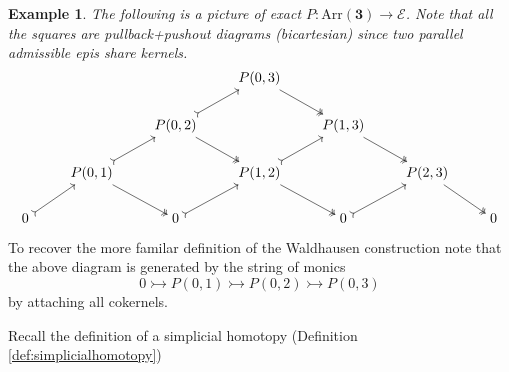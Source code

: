 \documentclass[12pt]{report}
\numberwithin{equation}{section}
\newtheorem{example}[dummy]{Example}
\begin{document}
	\begin{example}
		The following is a picture of exact \( P:\mathrm{Arr}(\mathbf{3}) \to \mathcal{E} \). Note that all the squares are pullback+pushout diagrams (bicartesian) since two parallel admissible epis share kernels.
			\[\begin{tikzcd}[cramped]
				&&& {P(0,3)} \\
				&& {P(0,2)} && {P(1,3)} \\
				& {P(0,1)} && {P(1,2)} && {P(2,3)} \\
				0 && 0 && 0 && 0
				\arrow[two heads, from=1-4, to=2-5]
				\arrow[tail, from=2-3, to=1-4]
				\arrow[two heads, from=2-3, to=3-4]
				\arrow[two heads, from=2-5, to=3-6]
				\arrow[tail, from=3-2, to=2-3]
				\arrow[two heads, from=3-2, to=4-3]
				\arrow[tail, from=3-4, to=2-5]
				\arrow[two heads, from=3-4, to=4-5]
				\arrow[two heads, from=3-6, to=4-7]
				\arrow[tail, from=4-1, to=3-2]
				\arrow[tail, from=4-3, to=3-4]
				\arrow[tail, from=4-5, to=3-6]
			\end{tikzcd}\]
	\end{example}
	To recover the more familar definition of the Waldhausen construction note that the above diagram is generated by the string of monics \[0\rightarrowtail P(0,1)\rightarrowtail P(0,2) \rightarrowtail P(0,3) \] by attaching all cokernels.
	
	Recall the definition of a simplicial homotopy (Definition \ref{def:simplicialhomotopy}) 
	
\end{document}
